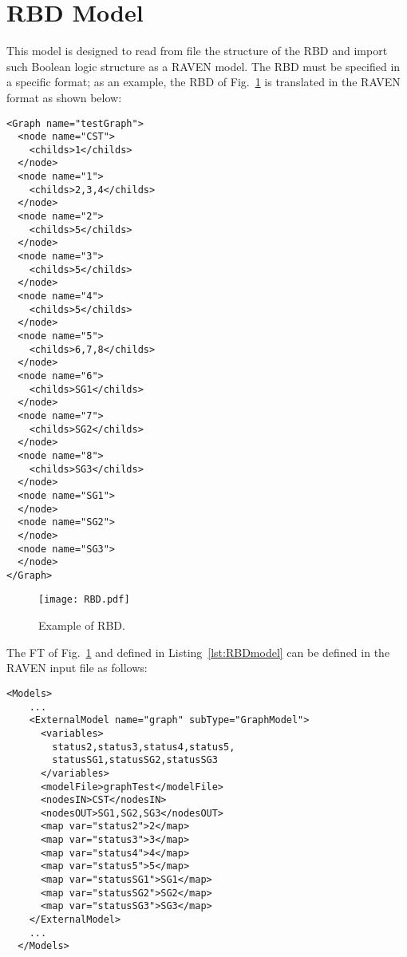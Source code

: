 \section{RBD Model}
\label{sec:RBDmodel}

This model is designed to read from file the structure of the RBD and import such Boolean logic structure as a RAVEN model.
The RBD must be specified in a specific format; as an example, the RBD of Fig.~\ref{fig:RBD} is translated in the RAVEN format as shown below:

\begin{lstlisting}[style=XML,morekeywords={anAttribute},caption=RBD input file., label=lst:RBDmodel]
<Graph name="testGraph">
  <node name="CST">
    <childs>1</childs>
  </node>
  <node name="1">
    <childs>2,3,4</childs>
  </node>
  <node name="2">
    <childs>5</childs>
  </node>
  <node name="3">
    <childs>5</childs>
  </node>
  <node name="4">
    <childs>5</childs>
  </node>
  <node name="5">
    <childs>6,7,8</childs>
  </node>
  <node name="6">
    <childs>SG1</childs>
  </node>
  <node name="7">
    <childs>SG2</childs>
  </node>
  <node name="8">
    <childs>SG3</childs>
  </node>
  <node name="SG1">
  </node>
  <node name="SG2">
  </node>
  <node name="SG3">
  </node>
</Graph>
\end{lstlisting} 

\begin{figure}
    \centering
    \centerline{\texttt{[image: RBD.pdf]}} 
    \caption{Example of RBD.}
    \label{fig:RBD}
\end{figure}

The FT of Fig.~\ref{fig:RBD} and defined in Listing~\ref{lst:RBDmodel} can be defined in the RAVEN input file as follows:

\begin{lstlisting}[style=XML,morekeywords={anAttribute},caption=RBD model input example., label=lst:RBD_InputExample]
  <Models> 
    ...
    <ExternalModel name="graph" subType="GraphModel">
      <variables>
        status2,status3,status4,status5,
        statusSG1,statusSG2,statusSG3
      </variables>
      <modelFile>graphTest</modelFile>
      <nodesIN>CST</nodesIN>
      <nodesOUT>SG1,SG2,SG3</nodesOUT>
      <map var="status2">2</map>
      <map var="status3">3</map>
      <map var="status4">4</map>
      <map var="status5">5</map>
      <map var="statusSG1">SG1</map>
      <map var="statusSG2">SG2</map>
      <map var="statusSG3">SG3</map>
    </ExternalModel>
    ...
  </Models>
\end{lstlisting}


